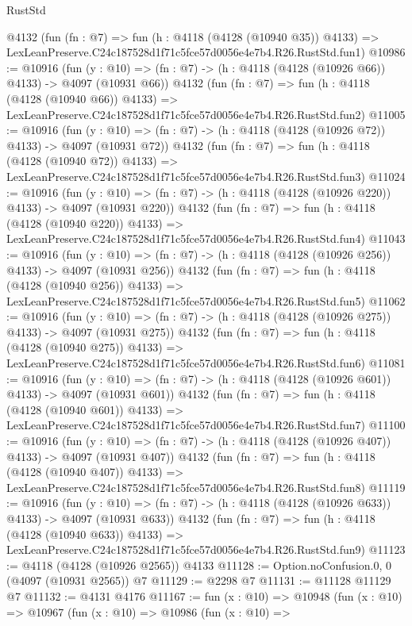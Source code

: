 \begin{lexlean}{RustStd}
\begin{coremodule}
    @4132
    (fun (fn : @7) =>
    fun (h : @4118 (@4128 (@10940 @35)) @4133) =>
    LexLeanPreserve.C24c187528d1f71c5fce57d0056e4e7b4.R26.RustStd.fun1)
@10986 := @10916
    (fun (y : @10) => (fn : @7) -> (h : @4118 (@4128 (@10926 @66)) @4133) -> @4097 (@10931 @66))
    @4132
    (fun (fn : @7) =>
    fun (h : @4118 (@4128 (@10940 @66)) @4133) =>
    LexLeanPreserve.C24c187528d1f71c5fce57d0056e4e7b4.R26.RustStd.fun2)
@11005 := @10916
    (fun (y : @10) => (fn : @7) -> (h : @4118 (@4128 (@10926 @72)) @4133) -> @4097 (@10931 @72))
    @4132
    (fun (fn : @7) =>
    fun (h : @4118 (@4128 (@10940 @72)) @4133) =>
    LexLeanPreserve.C24c187528d1f71c5fce57d0056e4e7b4.R26.RustStd.fun3)
@11024 := @10916
    (fun (y : @10) => (fn : @7) -> (h : @4118 (@4128 (@10926 @220)) @4133) -> @4097 (@10931 @220))
    @4132
    (fun (fn : @7) =>
    fun (h : @4118 (@4128 (@10940 @220)) @4133) =>
    LexLeanPreserve.C24c187528d1f71c5fce57d0056e4e7b4.R26.RustStd.fun4)
@11043 := @10916
    (fun (y : @10) => (fn : @7) -> (h : @4118 (@4128 (@10926 @256)) @4133) -> @4097 (@10931 @256))
    @4132
    (fun (fn : @7) =>
    fun (h : @4118 (@4128 (@10940 @256)) @4133) =>
    LexLeanPreserve.C24c187528d1f71c5fce57d0056e4e7b4.R26.RustStd.fun5)
@11062 := @10916
    (fun (y : @10) => (fn : @7) -> (h : @4118 (@4128 (@10926 @275)) @4133) -> @4097 (@10931 @275))
    @4132
    (fun (fn : @7) =>
    fun (h : @4118 (@4128 (@10940 @275)) @4133) =>
    LexLeanPreserve.C24c187528d1f71c5fce57d0056e4e7b4.R26.RustStd.fun6)
@11081 := @10916
    (fun (y : @10) => (fn : @7) -> (h : @4118 (@4128 (@10926 @601)) @4133) -> @4097 (@10931 @601))
    @4132
    (fun (fn : @7) =>
    fun (h : @4118 (@4128 (@10940 @601)) @4133) =>
    LexLeanPreserve.C24c187528d1f71c5fce57d0056e4e7b4.R26.RustStd.fun7)
@11100 := @10916
    (fun (y : @10) => (fn : @7) -> (h : @4118 (@4128 (@10926 @407)) @4133) -> @4097 (@10931 @407))
    @4132
    (fun (fn : @7) =>
    fun (h : @4118 (@4128 (@10940 @407)) @4133) =>
    LexLeanPreserve.C24c187528d1f71c5fce57d0056e4e7b4.R26.RustStd.fun8)
@11119 := @10916
    (fun (y : @10) => (fn : @7) -> (h : @4118 (@4128 (@10926 @633)) @4133) -> @4097 (@10931 @633))
    @4132
    (fun (fn : @7) =>
    fun (h : @4118 (@4128 (@10940 @633)) @4133) =>
    LexLeanPreserve.C24c187528d1f71c5fce57d0056e4e7b4.R26.RustStd.fun9)
@11123 := @4118 (@4128 (@10926 @2565)) @4133
@11128 := Option.noConfusion.{0, 0} (@4097 (@10931 @2565)) @7
@11129 := @2298 @7
@11131 := @11128 @11129 @7
@11132 := @4131 @4176
@11167 := fun (x : @10) =>
  @10948
    (fun (x : @10) =>
    @10967
      (fun (x : @10) =>
      @10986
        (fun (x : @10) =>

\end{coremodule}
\end{lexlean}
